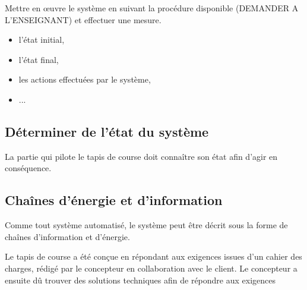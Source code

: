
Mettre en \oe uvre le système en suivant la procédure disponible (DEMANDER A L'ENSEIGNANT) et effectuer une mesure.


\begin{itemize}
 \item l'état initial,
 \item l'état final,
 \item les actions effectuées par le système,
 \item ...
\end{itemize}

\subsection{Déterminer de l'état du système}

La partie qui pilote le tapis de course doit connaître son état afin d'agir en conséquence. 



\subsection{Chaînes d'énergie et d'information}

Comme tout système automatisé, le système peut être décrit sous la forme de chaînes d'information et d'énergie.


Le tapis de course a été conçue en répondant aux exigences issues d'un cahier des charges, rédigé par le concepteur en collaboration avec le client. Le concepteur a ensuite dû trouver des solutions techniques afin de répondre aux exigences 

